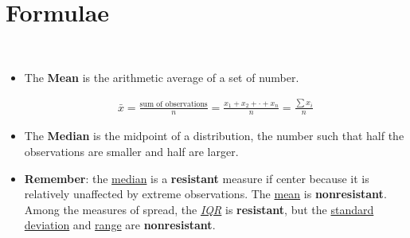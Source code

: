 \documentclass[Main.tex]{subfiles}
\begin{document}
	
	\chapter{Formulae}
	
	
	\begin{exercise} \hfill \\
		
		\begin{itemize}
			\item The \textbf{Mean} is the arithmetic average of a set of number.
			\begin{definition}[Mean]				
				\begin{subequations}
					\begin{align}
						\bar{x}=\frac{\text{sum of observations}}{n}=\frac{x_{1}+x_{2}+\cdot +x_{n}}{n}=\frac{\sum x_{i}}{n}
					\end{align}
				\end{subequations}
			\end{definition} \hfill
			
			\item The \textbf{Median} is the midpoint of a distribution, the number such that half the observations are smaller and half are larger.\\
			
			\item \textbf{Remember}: the \underline{median} is a \textbf{resistant} measure if center because it is relatively unaffected by extreme observations. The \underline{mean} is \textbf{nonresistant}. Among the measures of spread, the \emph{\underline{IQR}} is \textbf{resistant}, but the \underline{standard deviation} and \underline{range} are \textbf{nonresistant}.
		\end{itemize}	
	\end{exercise}
	
\end{document}
